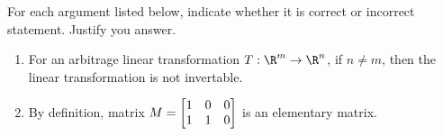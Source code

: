 \begin{exercises}
\begin{problist}
		\prob For each argument listed below, indicate whether it is correct or incorrect statement. Justify you answer.
            \begin{enumerate}
                \item   For an arbitrage linear transformation $T:\R^m\to\R^n$, if $n \neq m$, then the linear transformation is not invertable. 
                \item   By definition, matrix $M = \mat{1&0&0\\1&1&0}$ is an elementary matrix.
            \end{enumerate}
		
	\end{problist}
\end{exercises}
